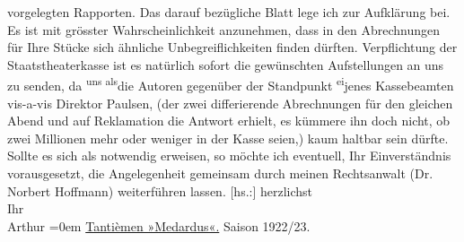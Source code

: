 \begin{ledgroupsized}[t]{13cm}
               vorgelegten Rapporten. Das darauf bezügliche Blatt lege ich zur Aufklärung bei.\pend
           \pstart
           Es ist mit grösster Wahrscheinlichkeit anzunehmen, dass in den Abrechnungen für Ihre
               Stücke sich ähnliche Unbegreiflichkeiten finden dürften.\pend
           \pstart
           Verpflichtung der Staatstheaterkasse ist es
               natürlich sofort die gewünschten Aufstellungen an uns zu senden, da \substVorne{}\textsuperscript{uns als}{\allowbreak}\substDazwischen{}die\substHinten{} Autoren gegenüber der Standpunkt \substVorne{}\textsuperscript{ei}\substDazwischen{}je\substHinten{}nes Kassebeamten vis-a-vis Direktor Paulsen, \introOben{}(\introOben{}der zwei differierende Abrechnungen für
               den gleichen Abend und auf Reklamation die Antwort erhielt, es kümmere ihn doch
               nicht, ob zwei Millionen mehr oder weniger in der Kasse seien,\introOben{})\introOben{} kaum haltbar sein dürfte.\pend
           \pstart
           Sollte es sich als notwendig erweisen, so möchte ich eventuell, Ihr Einverständnis
               vorausgesetzt, die Angelegenheit gemeinsam durch meinen Rechtsanwalt (Dr. Norbert Hoffmann) weiterführen lassen.\pend
           \pstart
           {[}hs.:{]} herzlichst{\\[\baselineskip]}Ihr{\\[\baselineskip]}\spacefill\mbox{Arthur}\pend
           \leftskip=0em{}\pstart
           \noindent{}\centering{}{\pb}\uline{Tantièmen »Medardus«.}\pend
           \pstart
           \noindent{}\centering{}Saison 1922/23.\pend
           \settowidth{\longeste}{Kassenrapporte:}\settowidth{\longestz}{Organ. Vorstl.}\settowidth{\longestd}{Mir verrechnet:}\settowidth{\longestv}{38,411.890}\settowidth{\longestf}{}\addtolength\longeste{1em}
        \addtolength\longestz{1em}
        \addtolength\longestd{1em}
        \addtolength\longestv{1em}
      \pstart\noindent{}\makebox[\the\longestz][l]{}

\end{ledgroupsized}

